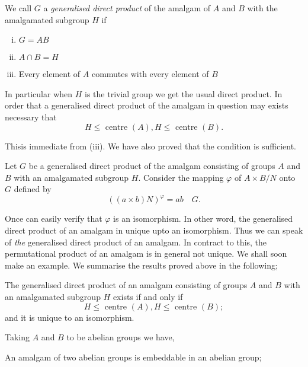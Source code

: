 We call $G$ a \textit{ generalised direct product } of the amalgam of
$A$ and $B$ with the amalgamated subgroup $H$ if  
\begin{enumerate}[(i)]
\item $G = AB$
\item $A \cap B = H$
\item Every element of $A$ commutes with every element of $B$ 
\end{enumerate}

In particular when $H$ is the trivial group we get the usual direct
product. In order that a generalised direct product of the amalgam in
question may exists necessary that  
$$
H \leq \text{ centre } (A), H \leq \text{ centre } (B).
$$

This\pageoriginale is immediate from (iii). We have also proved that the condition
is sufficient.  

Let $G$ be a generalised direct product of the amalgam consisting of
groups $A$ and $B$ with an amalgamated subgroup $H$. Consider the
mapping $\varphi$ of $A \times B /N$ onto $G$ defined by  
$$
(( a \times b)N) ^{\varphi}  = a b \quad G. 
$$

Once can easily verify that $\varphi$ is an isomorphism. In other
word, the generalised direct product of an amalgam in unique upto an
isomorphism. Thus we can speak of \textit{ the } generalised direct
product of an amalgam. In contract to this, the permutational product
of an amalgam is in general not unique. We shall soon make an
example. We summarise the results proved above in the following;  
\setcounter{theorem}{0}
\begin{theorem}\label{chap10:sec2:thm1}%
  The generalised direct product of an amalgam consisting of groups $A$
  and $B$ with an amalgamated subgroup $H$ exists if and only if  
  $$
  H \leq \text{ centre }(A),H \leq \text{ centre }(B);
  $$
  and it is unique to an isomorphism. 
\end{theorem}

Taking $A$ and $B$ to be abelian groups we have, 

\begin{coro*}%
  An amalgam of two abelian groups is embeddable in an abelian group; 
\end{coro*}

\section{ }\label{chap10:sec3} %

